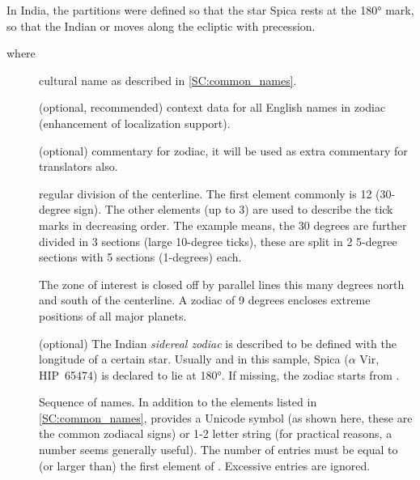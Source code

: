 In India, the partitions were defined so that the star Spica rests at the 180° mark, 
so that the Indian or  moves along the ecliptic with precession. 

where 
\begin{description}
\item[] cultural name as described in \ref{SC:common_names}.
\item[] (optional, recommended) context data for all English names in zodiac (enhancement of localization support).
\item[] (optional) commentary for zodiac, it will be used as extra commentary for translators also.
\item[] regular division of the centerline. The first element commonly is 12 (30-degree sign). 
The other elements (up to 3) are used to describe the tick marks in decreasing order. The example means, 
the 30 degrees are further divided in 3 sections (large 10-degree ticks), these are split in 2 5-degree sections with 5 sections (1-degrees) each.
\item[] The zone of interest is closed off by parallel lines this many degrees north and south of the centerline. 
A zodiac of 9 degrees encloses extreme positions of all major planets. 
\item[] (optional) The Indian \emph{sidereal zodiac} is described to be defined with the longitude of a certain star. 
Usually and in this sample, Spica ($\alpha$ Vir, HIP~65474) is declared to lie at 180°.  If missing, the zodiac starts from \Aries. 
\item[] Sequence of names. In addition to the elements listed in \ref{SC:common_names},  provides a Unicode symbol 
(as shown here, these are the common zodiacal signs) or 1-2 letter string (for practical reasons, a number seems generally useful). 
The number of entries must be equal to (or larger than) the first element of . Excessive entries are ignored. 
\end{description}


